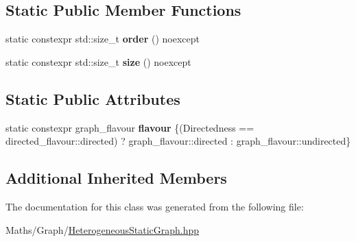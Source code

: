 \subsection*{Static Public Member Functions}
\begin{DoxyCompactItemize}
\item 
\mbox{\label{classsequoia_1_1maths_1_1heterogeneous__static__graph_af6000eaed8ce730e96a44b784a099b55}} 
static constexpr std\+::size\+\_\+t {\bfseries order} () noexcept
\item 
\mbox{\label{classsequoia_1_1maths_1_1heterogeneous__static__graph_a91240388036af75529cb2d7107dbf794}} 
static constexpr std\+::size\+\_\+t {\bfseries size} () noexcept
\end{DoxyCompactItemize}
\subsection*{Static Public Attributes}
\begin{DoxyCompactItemize}
\item 
\mbox{\label{classsequoia_1_1maths_1_1heterogeneous__static__graph_a7ad852899a59e57f1b553f286dacc8e1}} 
static constexpr graph\+\_\+flavour {\bfseries flavour} \{(Directedness == directed\+\_\+flavour\+::directed) ? graph\+\_\+flavour\+::directed \+: graph\+\_\+flavour\+::undirected\}
\end{DoxyCompactItemize}
\subsection*{Additional Inherited Members}


The documentation for this class was generated from the following file\+:\begin{DoxyCompactItemize}
\item 
Maths/\+Graph/\mbox{\hyperlink{_heterogeneous_static_graph_8hpp}{Heterogeneous\+Static\+Graph.\+hpp}}\end{DoxyCompactItemize}
